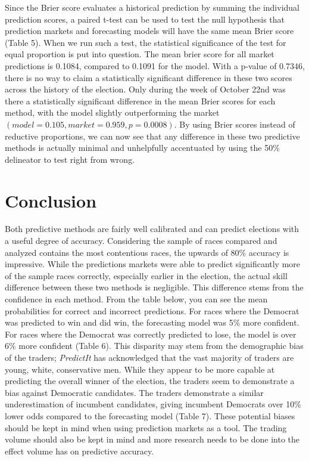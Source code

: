 \documentclass[11pt,]{article}
\begin{document}
Since the Brier score evaluates a historical prediction by summing the
individual prediction scores, a paired t-test can be used to test the
null hypothesis that prediction markets and forecasting models will have
the same mean Brier score (Table 5). When we run such a test, the
statistical significance of the test for equal proportion is put into
question. The mean brier score for all market predictions is 0.1084,
compared to 0.1091 for the model. With a p-value of 0.7346, there is no
way to claim a statistically significant difference in these two scores
across the history of the election. Only during the week of October 22nd
was there a statistically significant difference in the mean Brier
scores for each method, with the model slightly outperforming the market
\((model = 0.105, market = 0.959, p = 0.0008)\). By using Brier scores
instead of reductive proportions, we can now see that any difference in
these two predictive methods is actually minimal and unhelpfully
accentuated by using the 50\% delineator to test right from wrong.

\hypertarget{conclusion}{%
\section{Conclusion}\label{conclusion}}

Both predictive methods are fairly well calibrated and can predict
elections with a useful degree of accuracy. Considering the sample of
races compared and analyzed contains the most contentious races, the
upwards of 80\% accuracy is impressive. While the predictions markets
were able to predict significantly more of the sample races correctly,
especially earlier in the election, the actual skill difference between
these two methods is negligible. This difference stems from the
confidence in each method. From the table below, you can see the mean
probabilities for correct and incorrect predictions. For races where the
Democrat was predicted to win and did win, the forecasting model was 5\%
more confident. For races where the Democrat was correctly predicted to
lose, the model is over 6\% more confident (Table 6). This disparity may
stem from the demographic bias of the traders; \emph{PredictIt} has
acknowledged that the vast majority of traders are young, white,
conservative men. While they appear to be more capable at predicting the
overall winner of the election, the traders seem to demonstrate a bias
against Democratic candidates. The traders demonstrate a similar
underestimation of incumbent candidates, giving incumbent Democrats over
10\% lower odds compared to the forecasting model (Table 7). These
potential biases should be kept in mind when using prediction markets as
a tool. The trading volume should also be kept in mind and more research
needs to be done into the effect volume has on predictive accuracy.
\end{document}
